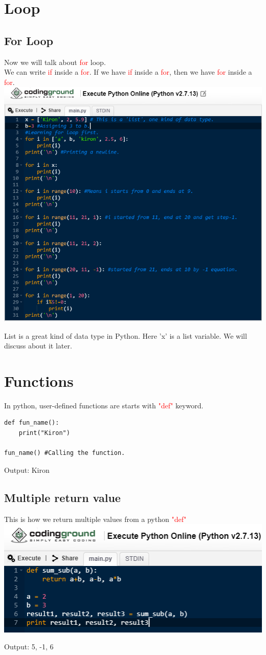 \documentclass[11 pt, letterpaper]{report}
\begin{document}
\section*{Loop}
\subsection*{For Loop}
Now we will talk about \textcolor{red}{for} loop.\\
We can write \textcolor{red}{if} inside a \textcolor{red}{for}. If we have \textcolor{red}{if} inside a \textcolor{red}{for}, then we have \textcolor{red}{for} inside a \textcolor{red}{for}.\\
\includegraphics[width=260 px, height=230 px]{For Loop practice.png}

List is a great kind of data type in Python. Here 'x' is a list variable. We will discuss about it later.

\section*{Functions}
In python, user-defined functions are starts with \textcolor{red}{"def"} keyword.
\begin{lstlisting}
def fun_name():
	print("Kiron")
	
fun_name() #Calling the function.
\end{lstlisting}
\begin{tcolorbox}
Output: Kiron
\end{tcolorbox}

\subsection*{Multiple return value}
This is how we return multiple values from a python \textcolor{red}{"def"}\\
\includegraphics[width=200 px]{Multiple return value from function def.png}
\begin{tcolorbox}
Output: 5, -1, 6
\end{tcolorbox}
\end{document}
